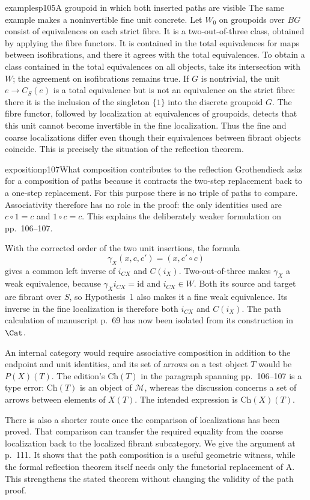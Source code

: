 \begin{dcomment}{examples}{p105}{A groupoid in which both inserted paths are visible}
The same example makes a noninvertible fine unit concrete. Let $W_0$ on groupoids over $BG$ consist of equivalences on each strict fibre. It is a two-out-of-three class, obtained by applying the fibre functors. It is contained in the total equivalences for maps between isofibrations, and there it agrees with the total equivalences. To obtain a class contained in the total equivalences on all objects, take its intersection with $W$; the agreement on isofibrations remains true. If $G$ is nontrivial, the unit $e\to C_S(e)$ is a total equivalence but is not an equivalence on the strict fibre: there it is the inclusion of the singleton $\{1\}$ into the discrete groupoid $G$. The fibre functor, followed by localization at equivalences of groupoids, detects that this unit cannot become invertible in the fine localization. Thus the fine and coarse localizations differ even though their equivalences between fibrant objects coincide. This is precisely the situation of the reflection theorem.
\end{dcomment}

\begin{dcomment}{exposition}{p107}{What composition contributes to the reflection}
Grothendieck asks for a composition of paths because it contracts the two-step replacement back to a one-step replacement. For this purpose there is no triple of paths to compare. Associativity therefore has no role in the proof: the only identities used are $c\circ1=c$ and $1\circ c=c$. This explains the deliberately weaker formulation on pp.~106--107.

With the corrected order of the two unit insertions, the formula
\[
 \gamma_X(x,c,c')=(x,c'\circ c)
\]
gives a common left inverse of $i_{CX}$ and $C(i_X)$. Two-out-of-three makes $\gamma_X$ a weak equivalence, because $\gamma_Xi_{CX}=\mathrm{id}$ and $i_{CX}\in W$. Both its source and target are fibrant over $S$, so Hypothesis~1 also makes it a fine weak equivalence. Its inverse in the fine localization is therefore both $i_{CX}$ and $C(i_X)$. The path calculation of manuscript p.~69 has now been isolated from its construction in $\Cat$.

An internal category would require associative composition in addition to the endpoint and unit identities, and its set of arrows on a test object $T$ would be $P(X)(T)$. The edition's $\mathrm{Ch}(T)$ in the paragraph spanning pp.~106--107 is a type error: $\mathrm{Ch}(T)$ is an object of $\mathcal M$, whereas the discussion concerns a set of arrows between elements of $X(T)$. The intended expression is $\mathrm{Ch}(X)(T)$.

There is also a shorter route once the comparison of localizations has been proved. That comparison can transfer the required equality from the coarse localization back to the localized fibrant subcategory. We give the argument at p.~111. It shows that the path composition is a useful geometric witness, while the formal reflection theorem itself needs only the functorial replacement of A. This strengthens the stated theorem without changing the validity of the path proof.
\end{dcomment}

